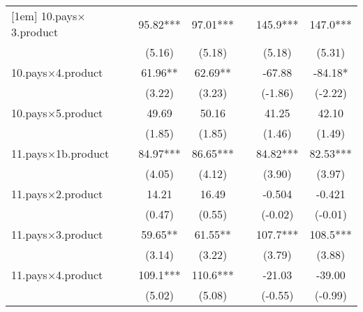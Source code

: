 {\begin{tabular}{l*{6}{c}}
[1em]
10.pays$\times$3.product   &                     &       95.82***&       97.01***&                     &       145.9***&       147.0***\\
                    &                     &      (5.16)         &      (5.18)         &                     &      (5.18)         &      (5.31)         \\
[1em]
10.pays$\times$4.product   &                     &       61.96** &       62.69** &                     &      -67.88         &      -84.18*  \\
                    &                     &      (3.22)         &      (3.23)         &                     &     (-1.86)         &     (-2.22)         \\
[1em]
10.pays$\times$5.product   &                     &       49.69         &       50.16         &                     &       41.25         &       42.10         \\
                    &                     &      (1.85)         &      (1.85)         &                     &      (1.46)         &      (1.49)         \\
[1em]
11.pays$\times$1b.product  &                     &       84.97***&       86.65***&                     &       84.82***&       82.53***\\
                    &                     &      (4.05)         &      (4.12)         &                     &      (3.90)         &      (3.97)         \\
[1em]
11.pays$\times$2.product   &                     &       14.21         &       16.49         &                     &      -0.504         &      -0.421         \\
                    &                     &      (0.47)         &      (0.55)         &                     &     (-0.02)         &     (-0.01)         \\
[1em]
11.pays$\times$3.product   &                     &       59.65** &       61.55** &                     &       107.7***&       108.5***\\
                    &                     &      (3.14)         &      (3.22)         &                     &      (3.79)         &      (3.88)         \\
[1em]
11.pays$\times$4.product   &                     &       109.1***&       110.6***&                     &      -21.03         &      -39.00         \\
                    &                     &      (5.02)         &      (5.08)         &                     &     (-0.55)         &     (-0.99)         \\

\end{tabular}}
